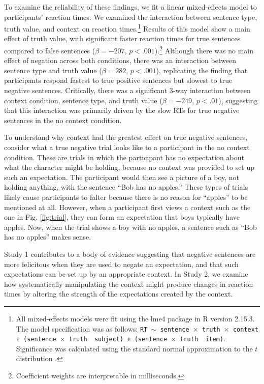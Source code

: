 \documentclass[10pt,letterpaper]{article}
\begin{document}
To examine the reliability of these findings, we fit a linear mixed-effects model to participants' reaction times.  We examined the interaction between sentence type, truth value, and context on reaction times.\footnote{All mixed-effects models were fit using the lme4 package in R version 2.15.3.  The model specification was as follows: \texttt{RT $\sim$ sentence~$\times$~truth~$\times$~context + (sentence~$\times$~truth~\textbar~subject) +  (sentence~$\times$~truth~\textbar~item)}.  Significance was calculated using the standard normal approximation to the $t$ distribution \cite{barr2013}.}  Results of this model show a main effect of truth value, with significant faster reaction times for true sentences compared to false sentences ($\beta= -207$, $p< .001$).\footnote{Coefficient weights are interpretable in milliseconds.}  Although there was no main effect of negation across both conditions, there was an interaction between sentence type and truth value ($\beta= 282$, $p< .001$), replicating the finding that participants respond fastest to true positive sentences but slowest to true negative sentences.  Critically, there was a significant 3-way interaction between context condition, sentence type, and truth value ($\beta= -249$, $p< .01$), suggesting that this interaction was primarily driven by the slow RTs for true negative sentences in the no context condition.  

To understand why context had the greatest effect on true negative sentences, consider what a true negative trial looks like to a participant in the no context condition.  These are trials in which the participant has no expectation about what the character might be holding, because no context was provided to set up such an expectation.  The participant would then see a picture of a boy, not holding anything, with the sentence ``Bob has no apples.''  These types of trials likely cause participants to falter because there is no reason for ``apples'' to be mentioned at all.  However, when a participant first views a context such as the one in Fig. \ref{fig:trial}, they can form an expectation that boys typically have apples.  Now, when the trial shows a boy with no apples, a sentence such as ``Bob has no apples'' makes sense.

Study 1 contributes to a body of evidence suggesting that negative sentences are more felicitous when they are used to negate an expectation, and that such expectations can be set up by an appropriate context.  In Study 2, we examine how systematically manipulating the context might produce changes in reaction times by altering the strength of the expectations created by the context.  
\end{document}
